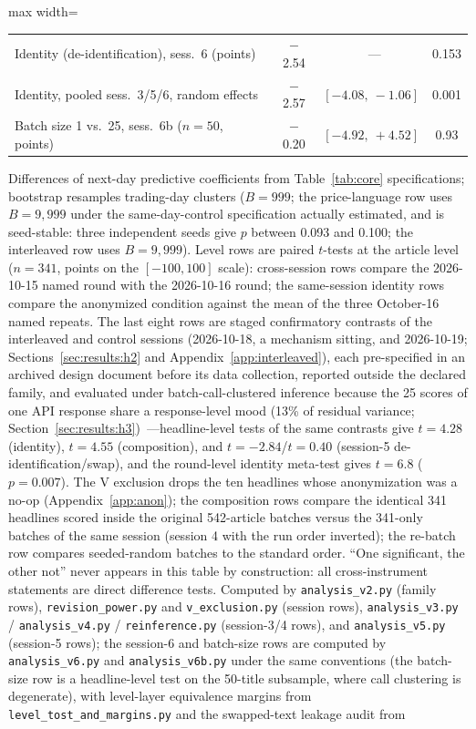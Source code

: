 \begin{table}[htbp]
\begin{threeparttable}
\begin{adjustbox}{max width=\textwidth}
\begin{tabular}{lccc}
Identity (de-identification), sess.\ 6 (points) & $-$2.54 &~--- & 0.153 \\
Identity, pooled sess.\ 3/5/6, random effects & $-$2.57 & $[-4.08,\ -1.06]$ & 0.001 \\
Batch size 1 vs.\ 25, sess.\ 6b ($n=50$, points) & $-$0.20 & $[-4.92,\ +4.52]$ & 0.93 \\
\bottomrule
\end{tabular}
\end{adjustbox}
\begin{tablenotes}[flushleft]\footnotesize
\item Differences of next-day predictive coefficients from Table~\ref{tab:core} specifications; bootstrap resamples trading-day clusters ($B=999$; the price-language row uses $B=9{,}999$ under the same-day-control specification actually estimated, and is seed-stable: three independent seeds give $p$ between 0.093 and 0.100; the interleaved row uses $B=9{,}999$). Level rows are paired $t$-tests at the article level ($n=341$, points on the $[-100,100]$ scale): cross-session rows compare the 2026-10-15 named round with the 2026-10-16 round; the same-session identity rows compare the anonymized condition against the mean of the three October-16 named repeats. The last eight rows are staged confirmatory contrasts of the interleaved and control sessions (2026-10-18, a mechanism sitting, and 2026-10-19; Sections~\ref{sec:results:h2} and Appendix~\ref{app:interleaved}), each pre-specified in an archived design document before its data collection, reported outside the declared family, and evaluated under batch-call-clustered inference because the 25 scores of one API response share a response-level mood (13\% of residual variance; Section~\ref{sec:results:h3})~---headline-level tests of the same contrasts give $t=4.28$ (identity), $t=4.55$ (composition), and $t=-2.84$/$t=0.40$ (session-5 de-identification/swap), and the round-level identity meta-test gives $t=6.8$ ($p=0.007$). The V exclusion drops the ten headlines whose anonymization was a no-op (Appendix~\ref{app:anon}); the composition rows compare the identical 341 headlines scored inside the original 542-article batches versus the 341-only batches of the same session (session 4 with the run order inverted); the re-batch row compares seeded-random batches to the standard order. ``One significant, the other not'' never appears in this table by construction: all cross-instrument statements are direct difference tests. Computed by \texttt{analysis\_v2.py} (family rows), \texttt{revision\_power.py} and \texttt{v\_exclusion.py} (session rows), \texttt{analysis\_v3.py} / \texttt{analysis\_v4.py} / \texttt{reinference.py} (session-3/4 rows), and \texttt{analysis\_v5.py} (session-5 rows); the session-6 and batch-size rows are computed by \texttt{analysis\_v6.py} and \texttt{analysis\_v6b.py} under the same conventions (the batch-size row is a headline-level test on the 50-title subsample, where call clustering is degenerate), with level-layer equivalence margins from \texttt{level\_tost\_and\_margins.py} and the swapped-text leakage audit from 
\end{tablenotes}
\end{threeparttable}
\end{table}
